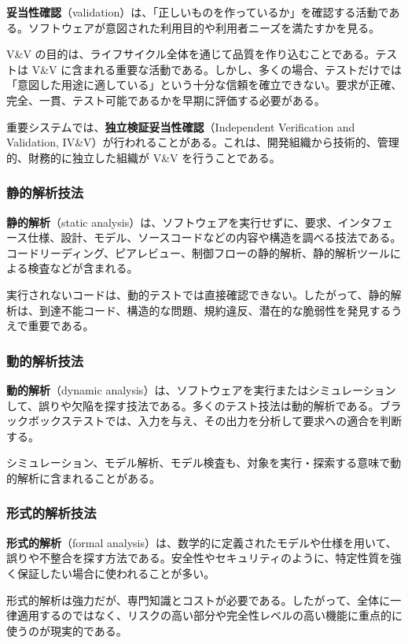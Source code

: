 \documentclass[11pt,a4paper]{article}
\newcommand{\term}[2]{\textbf{#1}（#2）}
\begin{document}
\term{妥当性確認}{validation}は、「正しいものを作っているか」を確認する活動である。ソフトウェアが意図された利用目的や利用者ニーズを満たすかを見る。

V\&V の目的は、ライフサイクル全体を通じて品質を作り込むことである。テストは V\&V に含まれる重要な活動である。しかし、多くの場合、テストだけでは「意図した用途に適している」という十分な信頼を確立できない。要求が正確、完全、一貫、テスト可能であるかを早期に評価する必要がある。

重要システムでは、\term{独立検証妥当性確認}{Independent Verification and Validation, IV\&V}が行われることがある。これは、開発組織から技術的、管理的、財務的に独立した組織が V\&V を行うことである。

\subsubsection{静的解析技法}
\term{静的解析}{static analysis}は、ソフトウェアを実行せずに、要求、インタフェース仕様、設計、モデル、ソースコードなどの内容や構造を調べる技法である。コードリーディング、ピアレビュー、制御フローの静的解析、静的解析ツールによる検査などが含まれる。

実行されないコードは、動的テストでは直接確認できない。したがって、静的解析は、到達不能コード、構造的な問題、規約違反、潜在的な脆弱性を発見するうえで重要である。

\subsubsection{動的解析技法}
\term{動的解析}{dynamic analysis}は、ソフトウェアを実行またはシミュレーションして、誤りや欠陥を探す技法である。多くのテスト技法は動的解析である。ブラックボックステストでは、入力を与え、その出力を分析して要求への適合を判断する。

シミュレーション、モデル解析、モデル検査も、対象を実行・探索する意味で動的解析に含まれることがある。

\subsubsection{形式的解析技法}
\term{形式的解析}{formal analysis}は、数学的に定義されたモデルや仕様を用いて、誤りや不整合を探す方法である。安全性やセキュリティのように、特定性質を強く保証したい場合に使われることが多い。

形式的解析は強力だが、専門知識とコストが必要である。したがって、全体に一律適用するのではなく、リスクの高い部分や完全性レベルの高い機能に重点的に使うのが現実的である。
\end{document}
